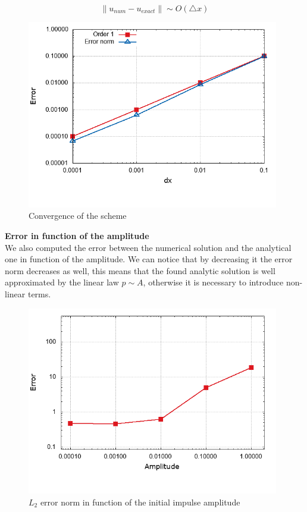 \documentclass[12pt,a4paper]{article}
\numberwithin{equation}{section}
\begin{document}
\begin{equation*}
\parallel u_{num} - u_{exact} \parallel \sim O(\triangle x)
\end{equation*}
\begin{figure}[H]
  \centering
    \includegraphics[width=11cm]{Convergence.png}
    \caption{Convergence of the scheme}
    \label{fig:convergence}
\end{figure}
\noindent
{\bf Error in function of the amplitude}\\
We also computed the error between the numerical solution and the analytical one in function of the amplitude. We can notice that by decreasing it the error norm decreases as well, this means that the found analytic solution is well approximated by the linear law $p \sim A$, otherwise it is necessary to introduce non-linear terms.
\begin{figure}[H]
  \centering
    \includegraphics[width=11cm]{error_amplitude.png}
    \caption{$L_2$ error norm in function of the initial impulse amplitude}
    \label{fig:Error_norm}
\end{figure}
\end{document}

